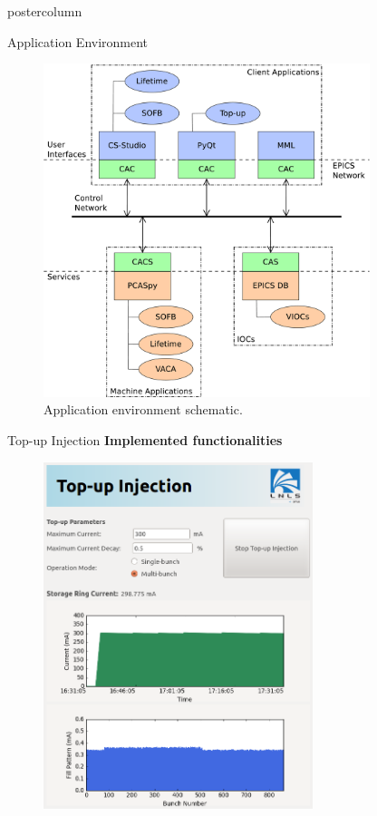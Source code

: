 \documentclass{beamer}
\begin{document}
\begin{frame}
\begin{columns}
\begin{column}{0.45\textwidth}
\begin{beamercolorbox}[center]{postercolumn}
\begin{minipage}{.98\textwidth}
{\begin{myblock}{Application Environment}
\begin{figure}
							\includegraphics[width=0.85\textwidth]{../WEPOPRPO22f1.eps}
							\caption{Application environment schematic.}
						\end{figure}
					\end{myblock}
					\begin{myblock}{Top-up Injection}
						\textbf{Implemented functionalities}
						\vspace{0.5cm}
						\begin{figure}
							\centering
							\includegraphics[width=0.7\textwidth]{../WEPOPRPO22f4.png}

\end{figure}
\end{myblock}}
\end{minipage}
\end{beamercolorbox}
\end{column}
\end{columns}
\end{frame}
\end{document}
